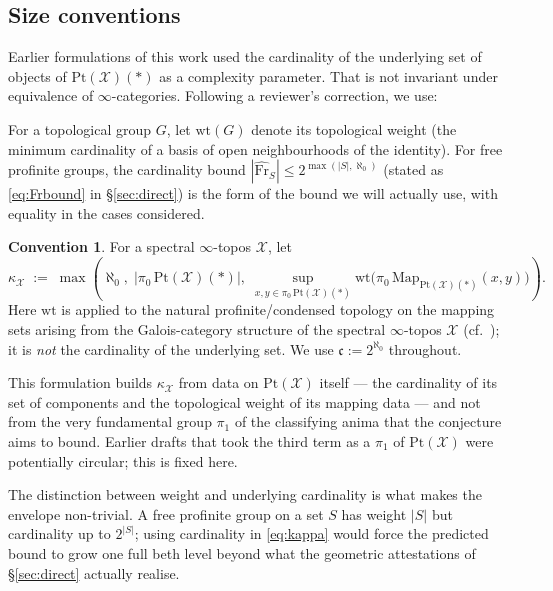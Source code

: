 \documentclass[11pt]{article}
\theoremstyle{definition}
\newtheorem*{convention}{Convention}
\theoremstyle{plain}
\theoremstyle{remark}
\newcommand{\Pt}{\mathrm{Pt}}
\newcommand{\Map}{\mathrm{Map}}
\newcommand{\Frhat}{\widehat{\mathrm{Fr}}}
\newcommand{\continuum}{\mathfrak{c}}
\begin{document}
\subsection{Size conventions}\label{sec:size}

Earlier formulations of this work used the cardinality of the underlying set
of objects of $\Pt(\mathcal X)(\ast)$ as a complexity parameter. That is not
invariant under equivalence of $\infty$-categories. Following a reviewer's
correction, we use:

For a topological group $G$, let $\mathrm{wt}(G)$ denote its topological
weight (the minimum cardinality of a basis of open neighbourhoods of the
identity). For free profinite groups, the cardinality bound
$|\Frhat_S| \le 2^{\max(|S|,\aleph_0)}$ (stated as \eqref{eq:Frbound} in
\S\ref{sec:direct}) is the form of the bound we will actually use, with
equality in the cases considered.

\begin{convention}\label{conv:kappa}
For a spectral $\infty$-topos $\mathcal X$, let
\begin{equation}\label{eq:kappa}
\kappa_{\mathcal X} \;:=\; \max\!\left(
  \aleph_0,\;
  |\pi_0\,\Pt(\mathcal X)(\ast)|,\;
  \sup_{x,y \in \pi_0\,\Pt(\mathcal X)(\ast)}
  \mathrm{wt}\bigl(\pi_0\,\Map_{\Pt(\mathcal X)(\ast)}(x,y)\bigr)
\right).
\end{equation}
Here $\mathrm{wt}$ is applied to the natural profinite/condensed topology on
the mapping sets arising from the Galois-category structure of the spectral
$\infty$-topos $\mathcal X$ (cf.\ \cite{BarwickGlasmanHaine2018, BhattScholze2015});
it is \emph{not} the cardinality of the underlying set. We use
$\continuum := 2^{\aleph_0}$ throughout.
\end{convention}

This formulation builds $\kappa_{\mathcal X}$ from data on $\Pt(\mathcal X)$
itself --- the cardinality of its set of components and the topological
weight of its mapping data --- and not from the very fundamental group
$\pi_1$ of the classifying anima that the conjecture aims to bound.
Earlier drafts that took the third term as a $\pi_1$ of $\Pt(\mathcal X)$
were potentially circular; this is fixed here.

The distinction between weight and underlying cardinality is what makes the
envelope non-trivial. A free profinite group on a set $S$ has weight $|S|$ but
cardinality up to $2^{|S|}$; using cardinality in \eqref{eq:kappa} would
force the predicted bound to grow one full beth level beyond what the
geometric attestations of \S\ref{sec:direct} actually realise.
\end{document}
